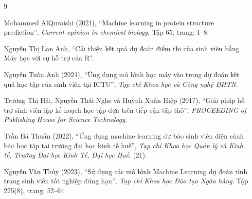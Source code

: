 \documentclass[12pt,a4paper,oneside]{report}
\begin{document}
\clearpage
{}
{}
\begin{thebibliography}{9}

Mohammed AlQuraishi (2021), ``Machine learning in protein structure
prediction'', \textit{Current opinion in chemical biology}. Tập 65, trang: 1--8.

Nguyễn Thị Lan Anh, ``Cải thiện kết quả dự đoán điểm thi của sinh viên
bằng Máy học với sự hỗ trợ của R''.

Nguyễn Tuấn Anh (2024), ``Ứng dụng mô hình học máy vào trong dự đoán kết
quả học tập của sinh viên tại ICTU'', \textit{Tạp chí Khoa học và Công nghệ ĐHTN}.

Trương Thị Hải, Nguyễn Thái Nghe và Huỳnh Xuân Hiệp (2017), ``Giải pháp
hỗ trợ sinh viên lập kế hoạch học tập dựa trên tiếp cận tập thô'',
\textit{PROCEEDING of Publishing House for Science Technology}.

Trần Bá Thuấn (2022), ``Ứng dụng machine learning dự báo sinh viên diện
cảnh báo học tập tại trường đại học kinh tế huế'', \textit{Tạp chí Khoa
học Quản lý và Kinh tế, Trường Đại học Kinh Tế, Đại học Huế}. (21).

Nguyễn Văn Thủy (2023), ``Sử dụng các mô hình Machine Learning dự đoán
tình trạng sinh viên tốt nghiệp đúng hạn'', \textit{Tạp chí Khoa học Đào
tạo Ngân hàng}. Tập 225(8), trang: 52--64.

\end{thebibliography}
\end{document}

